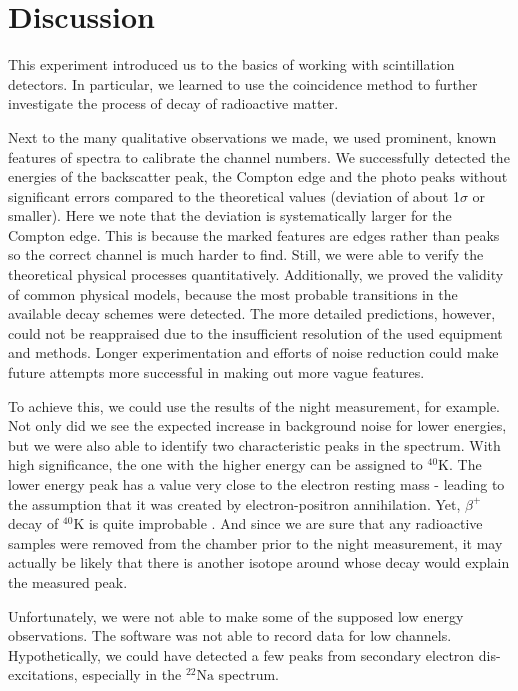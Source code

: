 \section{Discussion}
%
This experiment introduced us to the basics of working with scintillation detectors.
In particular, we learned to use the coincidence method to further investigate the process of decay of radioactive matter.
%
\par
%
Next to the many qualitative observations we made, we used prominent, known features of spectra to calibrate the channel numbers.
We successfully detected the energies of the backscatter peak, the Compton edge and the photo peaks without significant errors compared to the theoretical values (deviation of about \SI{1}{}$\sigma$ or smaller).
Here we note that the deviation is systematically larger for the Compton edge.
This is because the marked features are edges rather than peaks so the correct channel is much harder to find.
Still, we were able to verify the theoretical physical processes quantitatively.
Additionally, we proved the validity of common physical models, because the most probable transitions in the available decay schemes were detected.
The more detailed predictions, however, could not be reappraised due to the insufficient resolution of the used equipment and methods.
Longer experimentation and efforts of noise reduction could make future attempts more successful in making out more vague features.
%
\par
%
To achieve this, we could use the results of the night measurement, for example.
Not only did we see the expected increase in background noise for lower energies, but we were also able to identify two characteristic peaks in the spectrum.
With high significance, the one with the higher energy can be assigned to $^{40}\text{K}$.
The lower energy peak has a value very close to the electron resting mass - leading to the assumption that it was created by electron-positron annihilation.
Yet, $\beta^{+}$ decay of $^{40}\text{K}$ is quite improbable \cite{WikiPotassium}.
And since we are sure that any radioactive samples were removed from the chamber prior to the night measurement, it may actually be likely that there is another isotope around whose decay would explain the measured peak.
%
\par
%
Unfortunately, we were not able to make some of the supposed low energy observations.
The software was not able to record data for low channels.
Hypothetically, we could have detected a few peaks from secondary electron dis-excitations, especially in the $^{22}\text{Na}$ spectrum.

